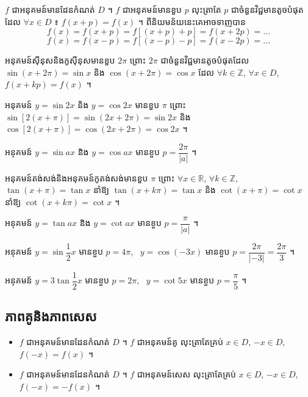 \begin{definition}
$f$ ជាអនុគមន៍មានដែនកំណត់ $D$ ។ $f$ ជាអនុគមន៍មានខួប $p$ លុះត្រាតែ $p$ ជាចំនួនវិជ្ជមានតូចបំផុត ដែល $\forall x \in D$ ៖ $f(x + p) = f(x)$ ។ ពីនិយមន័យនេះគេអាចទាញបាន
\[ f(x) = f(x + p) = f[(x + p) + p] = f(x + 2p) = \ldots \]
\[ f(x) = f(x - p) = f[(x - p) - p] = f(x - 2p) = \ldots \]
\end{definition}

\begin{formulaBox}[ជាទូទៅ]
អនុគមន៍ស៊ីនុសនិងកូស៊ីនុសមានខួប $2\pi$ ព្រោះ $2\pi$ ជាចំនួនវិជ្ជមានតូចបំផុតដែល $\sin(x + 2\pi) = \sin x$ និង $\cos(x + 2\pi) = \cos x$ ដែល $\forall k \in \mathbb{Z}$, $\forall x \in D$, $f(x + kp) = f(x)$ ។
\end{formulaBox}

\begin{note}[សម្គាល់]
អនុគមន៍ $y = \sin 2x$ និង $y = \cos 2x$ មានខួប $\pi$ ព្រោះ $\sin[2(x + \pi)] = \sin(2x + 2\pi) = \sin 2x$ និង $\cos[2(x + \pi)] = \cos(2x + 2\pi) = \cos 2x$ ។
\end{note}

\begin{formulaBox}[ជាទូទៅ]
អនុគមន៍ $y = \sin ax$ និង $y = \cos ax$ មានខួប $p = \dfrac{2\pi}{|a|}$ ។
\end{formulaBox}

អនុគមន៍តង់សង់និងអនុគមន៍កូតង់សង់មានខួប $\pi$ ព្រោះ $\forall x \in \mathbb{R}$, $\forall k \in \mathbb{Z}$, $\tan(x + \pi) = \tan x$ នាំឱ្យ $\tan(x + k\pi) = \tan x$ និង $\cot(x + \pi) = \cot x$ នាំឱ្យ $\cot(x + k\pi) = \cot x$ ។

\begin{formulaBox}[ជាទូទៅ]
អនុគមន៍ $y = \tan ax$ និង $y = \cot ax$ មានខួប $p = \dfrac{\pi}{|a|}$ ។
\end{formulaBox}

\begin{example}[ឧទាហរណ៍]
អនុគមន៍ $y = \sin\dfrac{1}{2}x$ មានខួប $p = 4\pi$, \ $y = \cos(-3x)$ មានខួប $p = \dfrac{2\pi}{|-3|} = \dfrac{2\pi}{3}$ ។

អនុគមន៍ $y = 3\tan\dfrac{1}{2}x$ មានខួប $p = 2\pi$, \ $y = \cot 5x$ មានខួប $p = \dfrac{\pi}{5}$ ។
\end{example}

\subsection{ភាពគូនិងភាពសេស}

\begin{definition}
\begin{itemize}
  \item $f$ ជាអនុគមន៍មានដែនកំណត់ $D$ ។ $f$ ជាអនុគមន៍គូ លុះត្រាតែគ្រប់ $x \in D$, $-x \in D$, $f(-x) = f(x)$ ។
  \item $f$ ជាអនុគមន៍មានដែនកំណត់ $D$ ។ $f$ ជាអនុគមន៍សេស លុះត្រាតែគ្រប់ $x \in D$, $-x \in D$, $f(-x) = -f(x)$ ។
\end{itemize}
\end{definition}

